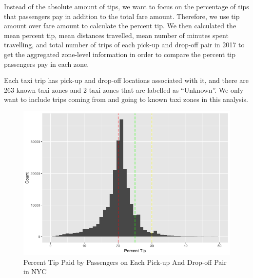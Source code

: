 \documentclass[12pt,twoside]{reedthesis}
\newenvironment{Shaded}{\begin{snugshade}}{\end{snugshade}}
\newcommand{\KeywordTok}[1]{\textcolor[rgb]{0.13,0.29,0.53}{\textbf{#1}}}
\newcommand{\DataTypeTok}[1]{\textcolor[rgb]{0.13,0.29,0.53}{#1}}
\newcommand{\DecValTok}[1]{\textcolor[rgb]{0.00,0.00,0.81}{#1}}
\newcommand{\StringTok}[1]{\textcolor[rgb]{0.31,0.60,0.02}{#1}}
\newcommand{\OperatorTok}[1]{\textcolor[rgb]{0.81,0.36,0.00}{\textbf{#1}}}
\newcommand{\NormalTok}[1]{#1}
\theoremstyle{definition}
\theoremstyle{definition}
\theoremstyle{definition}
\theoremstyle{remark}
\begin{document}
Instead of the absolute amount of tips, we want to focus on the
percentage of tips that passengers pay in addition to the total fare
amount. Therefore, we use tip amount over fare amount to calculate the
percent tip. We then calculated the mean percent tip, mean distances
travelled, mean number of minutes spent travelling, and total number of
trips of each pick-up and drop-off pair in 2017 to get the aggregated
zone-level information in order to compare the percent tip passengers
pay in each zone.
\begin{Shaded}
\end{Shaded}
Each taxi trip has pick-up and drop-off locations associated with it,
and there are 263 known taxi zones and 2 taxi zones that are labelled as
``Unknown''. We only want to include trips coming from and going to
known taxi zones in this analysis.
\begin{figure}

{\centering \includegraphics[width=5.96in]{figure/region_vis} 

}

\caption{Percent Tip Paid by Passengers on Each Pick-up And Drop-off Pair in NYC}\label{fig:region-vis}
\end{figure}
\end{document}
